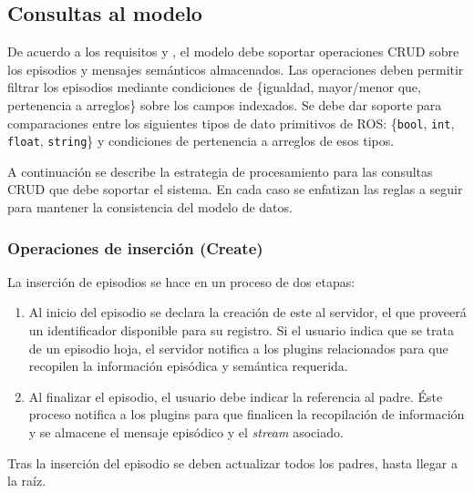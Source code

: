 \subsection{Consultas al modelo}

De acuerdo a los requisitos  y , el modelo debe soportar operaciones CRUD sobre los episodios y mensajes semánticos almacenados. Las operaciones deben permitir filtrar los episodios mediante condiciones de \{igualdad, mayor/menor que, pertenencia a arreglos\} sobre los campos indexados. Se debe dar soporte para comparaciones entre los siguientes tipos de dato primitivos de ROS: \{\texttt{bool}, \texttt{int}, \texttt{float}, \texttt{string}\} y condiciones de pertenencia a arreglos de esos tipos.

A continuación se describe la estrategia de procesamiento para las consultas CRUD que debe soportar el sistema. En cada caso se enfatizan las reglas a seguir para mantener la consistencia del modelo de datos.

\subsubsection{Operaciones de inserción (Create)}

La inserción de episodios se hace en un proceso de dos etapas:
\begin{enumerate}
\item  Al inicio del episodio se declara la creación de este al servidor, el que proveerá un identificador disponible para su registro. Si el usuario indica que se trata de un episodio hoja, el servidor notifica a los plugins relacionados para que recopilen la información episódica y semántica requerida.
\item  Al finalizar el episodio, el usuario debe indicar la referencia al padre. Éste proceso notifica a los plugins para que finalicen la recopilación de información y se almacene el mensaje episódico y el \textit{stream} asociado.
\end{enumerate}
Tras la inserción del episodio se deben actualizar todos los padres, hasta llegar a la raíz.

